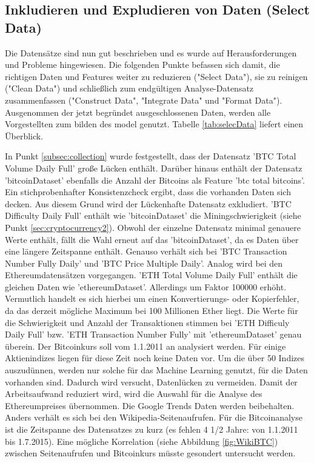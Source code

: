 \subsection{Inkludieren und Expludieren von Daten (Select Data)}
Die Datensätze sind nun gut beschrieben und es wurde auf Herausforderungen und Probleme hingewiesen. Die folgenden Punkte befassen sich damit, die richtigen Daten und Features weiter zu reduzieren ("Select Data"), sie zu reinigen ("Clean Data") und schließlich zum endgültigen Analyse-Datensatz zusammenfassen ("Construct Data", "Integrate Data" und "Format Data").
Ausgenommen der jetzt begründet ausgeschlossenen Daten, werden alle Vorgestellten zum bilden des \gls{model} genutzt. Tabelle \ref{tab:selecData} liefert einen Überblick.

In Punkt \ref{subsec:collection} wurde festgestellt, dass der Datensatz 'BTC \textunderscore Total \textunderscore Volume \textunderscore Daily \textunderscore Full' große Lücken enthält. Darüber hinaus enthält der Datensatz 'bitcoinDataset' ebenfalls die Anzahl der Bitcoins als Feature 'btc \textunderscore total \textunderscore bitcoins'. Ein stichprobenhafter Konsistenzcheck ergibt, dass die vorhanden Daten sich decken. Aus diesem Grund wird der Lückenhafte Datensatz exkludiert. 
'BTC \textunderscore Difficulty \textunderscore Daily \textunderscore Full' enthält wie 'bitcoinDataset' die Miningschwierigkeit (siehe Punkt \ref{sec:cryptocurrency2}). Obwohl der einzelne Datensatz minimal genauere Werte enthält, fällt die Wahl erneut auf das 'bitcoinDataset', da es Daten über eine längere Zeitspanne enthält. Genauso verhält sich bei 'BTC \textunderscore Transaction \textunderscore Number \textunderscore Fully \textunderscore Daily' und 'BTC \textunderscore Price \textunderscore Multiple \textunderscore Daily'. 
Analog wird bei den Ethereumdatensätzen vorgegangen. 'ETH \textunderscore Total \textunderscore Volume \textunderscore Daily \textunderscore Full' enthält die gleichen Daten wie 'ethereumDataset'. Allerdings um Faktor 100000 erhöht. Vermutlich handelt es sich hierbei um einen Konvertierungs- oder Kopierfehler, da das derzeit mögliche Maximum bei 100 Millionen Ether liegt. Die Werte für die Schwierigkeit und Anzahl der Transaktionen stimmen bei 'ETH \textunderscore Difficuly \textunderscore Daily \textunderscore Full' bzw. 'ETH \textunderscore Transaction \textunderscore Number \textunderscore Fully' mit 'ethereumDataset' genau überein. 
Der Bitcoinkurs soll vom 1.1.2011 an analysiert werden. Für einige Aktienindizes liegen für diese Zeit noch keine Daten vor. Um die über 50 Indizes auszudünnen, werden nur solche für das Machine Learning genutzt, für die Daten vorhanden sind. Dadurch wird versucht, Datenlücken zu vermeiden. Damit der Arbeitsaufwand reduziert wird, wird die Auswahl für die Analyse des Ethereumpreises übernommen. Die Google Trends Daten werden beibehalten. Anders verhält es sich bei den Wikipedia-Seitenaufrufen. Für die Bitcoinanalyse ist die Zeitspanne des Datensatzes zu kurz (es fehlen 4 1/2 Jahre: von 1.1.2011 bis 1.7.2015). Eine mögliche Korrelation (siehe Abbildung \ref{fig:WikiBTC}) zwischen Seitenaufrufen und Bitcoinkurs müsste gesondert untersucht werden. 
